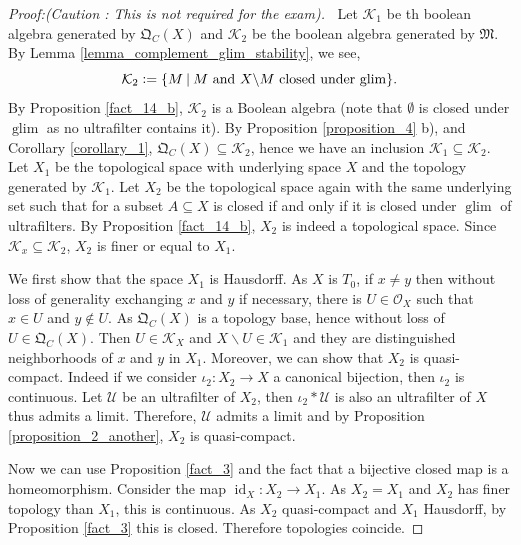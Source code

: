 \documentclass[8pt]{article}
\numberwithin{equation}{section}
\DeclareMathOperator{\id}{id}
\DeclareMathOperator{\Lim}{Lim}
\DeclareMathOperator{\glim}{glim}
\newcommand{\defeq}{\vcentcolon=}
\newcommand{\Ouv}{\mathscr{O}}
\newcommand{\U}[0]{\mathcal{U}}
\newcommand{\K}[0]{\mathcal{K}}
\newcommand{\sep}[0]{\:|\:}
\newcommand{\QC}[0]{\mathfrak{Q}_C}
\begin{document}
\begin{proof}[Proof:(Caution : This is not required for the exam)]$\:$
Let $\mathcal{K}_1$ be th boolean algebra generated by $\QC(X)$ and $\mathcal{K}_2$ be the boolean algebra generated by $\mathfrak{M}$. By Lemma \ref{lemma_complement_glim_stability}, we see,
\begin{equation*}
    \mathcal{K}_2 \defeq \{M\sep \text{$M$ and $X\backslash M$ closed under $\glim$}\}.
\end{equation*}
By Proposition \ref{fact_14_b}, $\mathcal{K}_2$ is a Boolean algebra (note that $\emptyset$ is closed under $\glim$ as no ultrafilter contains it). By Proposition \ref{proposition_4} b), and Corollary \ref{corollary_1}, $\QC(X)\subseteq\mathcal{K}_2$, hence we have an inclusion $\mathcal{K}_1\subseteq\mathcal{K}_2$.
Let $X_1$ be the topological space with underlying space $X$ and the topology generated by $\K_1$. Let $X_2$ be the topological space again with the same underlying set such that for a subset $A\subseteq X$ is closed if and only if it is closed under $\glim$ of ultrafilters.
By Proposition \ref{fact_14_b}, $X_2$ is indeed a topological space. Since $\K_x\subseteq \K_2$, $X_2$ is finer or equal to $X_1$.
\par We first show that the space $X_1$ is Hausdorff. As $X$ is $T_0$, if $x\not=y$ then without loss of generality exchanging $x$ and $y$ if necessary, there is $U\in\Ouv_X$ such that $x\in U$ and $y\not\in U$. As $\QC(X)$ is a topology base, hence without loss of $U\in\QC(X)$. Then $U\in\K_X$ and $X\backslash U\in\K_1$ and they are distinguished neighborhoods of $x$ and $y$ in $X_1$.
Moreover, we can show that $X_2$ is quasi-compact. Indeed if we consider $\iota_2:X_2\to X$ a canonical bijection, then $\iota_2$ is continuous. Let $\U$ be an ultrafilter of $X_2$, then $\iota_2*\U$ is also an ultrafilter of $X$ thus admits a limit. Therefore, $\U$ admits a limit and by Proposition \ref{proposition_2_another}, $X_2$ is quasi-compact. %
\par Now we can use Proposition \ref{fact_3} and the fact that a bijective closed map is a homeomorphism. Consider the map $\id_X:X_2\to X_1$. As $X_2=X_1$ and $X_2$ has finer topology than $X_1$, this is continuous. As $X_2$ quasi-compact and $X_1$ Hausdorff, by Proposition \ref{fact_3} this is closed. Therefore topologies coincide.

\end{proof}
\end{document}
